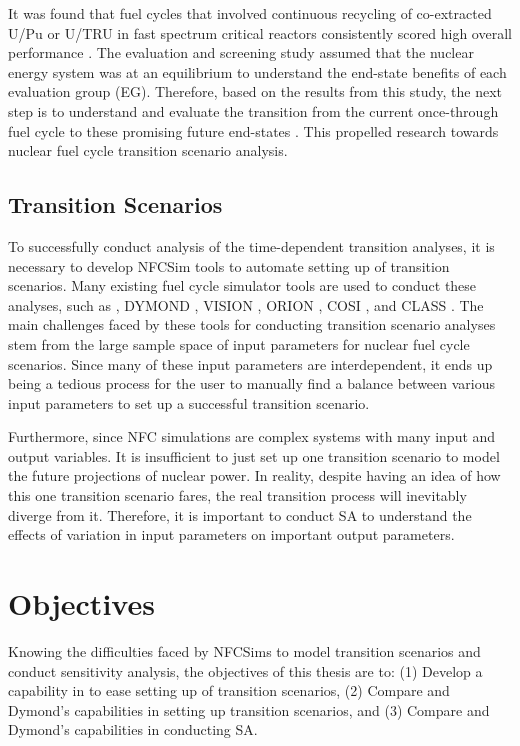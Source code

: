 It was found that fuel cycles that involved continuous recycling
of co-extracted U/Pu or U/TRU in fast spectrum critical reactors
consistently scored high overall performance . 
The evaluation and screening study assumed that 
the nuclear energy system was at an equilibrium to understand 
the end-state benefits of each evaluation group (EG). 
Therefore, based on the results from this study, the next step is 
to understand and evaluate the transition from the current 
once-through fuel cycle to these promising 
future end-states \cite{feng_standardized_2016}. 
This propelled research towards nuclear fuel cycle transition 
scenario analysis. 

\subsection{Transition Scenarios}
To successfully conduct analysis of the time-dependent transition
analyses, it is necessary to develop \gls{NFCSim} tools to  
automate setting up of transition scenarios. 
Many existing fuel cycle simulator tools are used to conduct 
these analyses, such as 
\Cyclus \cite{huff_fundamental_2016},
DYMOND \cite{yacout_modeling_2005},
VISION \cite{jacobson_vision:_2006},
ORION \cite{gregg_analysis_2012}, 
COSI \cite{coquelet-pascal_cosi6:_2015}, 
and CLASS \cite{mouginot_class_2012}. 
The main challenges faced by these tools for conducting transition 
scenario analyses stem from the large sample space of input 
parameters for nuclear fuel cycle scenarios.
Since many of these input parameters are interdependent, it ends
up being a tedious process for the user to manually find a balance 
between various input parameters to set up a successful transition 
scenario. 

Furthermore, since \gls{NFC} simulations are complex systems with 
many input and output variables. 
It is insufficient to just set up one transition scenario to model 
the future projections of nuclear power. 
In reality, despite having an idea of how this one transition 
scenario fares, the real transition process will 
inevitably diverge from it. 
Therefore, it is important to conduct \gls{SA} to understand 
the effects of variation in input parameters on 
important output parameters. 

\section{Objectives}
Knowing the difficulties faced by \gls{NFCSim}s to model 
transition scenarios and conduct sensitivity analysis, 
the objectives of this thesis are to: 
(1) Develop a capability in \Cyclus to ease setting up of transition 
scenarios, 
(2) Compare \Cyclus and Dymond's capabilities in setting up 
transition scenarios, and 
(3) Compare \Cyclus and Dymond's capabilities in conducting \gls{SA}. 